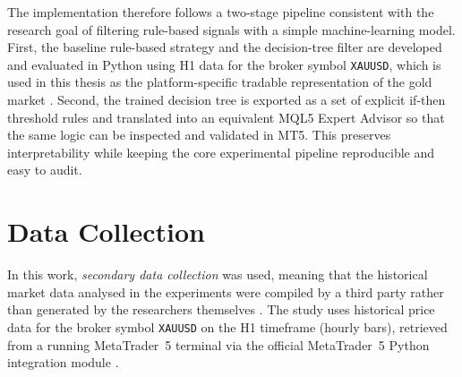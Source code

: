 The implementation therefore follows a two-stage pipeline consistent with the
research goal of filtering rule-based signals with a simple machine-learning
model. First, the baseline rule-based strategy and the decision-tree filter are
developed and evaluated in Python using H1 data for the broker symbol
\texttt{XAUUSD}, which is used in this thesis as the platform-specific tradable
representation of the gold market \citep{mt5_copy_rates_range}. Second, the
trained decision tree is exported as a set of explicit if-then threshold rules
and translated into an equivalent MQL5 Expert Advisor so that the same logic
can be inspected and validated in MT5. This preserves interpretability while
keeping the core experimental pipeline reproducible and easy to audit.



















\section{Data Collection}

In this work, \emph{secondary data collection} was used, meaning that the
historical market data analysed in the experiments were compiled by a third
party rather than generated by the researchers themselves
\citep{johnston2014secondary, taherdoost2021data}. The study uses historical
price data for the broker symbol \texttt{XAUUSD} on the H1 timeframe (hourly
bars), retrieved from a running MetaTrader~5 terminal via the official
MetaTrader~5 Python integration module
\citep{mt5_python_integration, mt5_copy_rates_range}.

